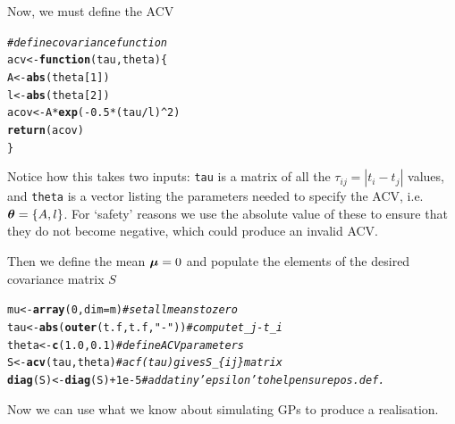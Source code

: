\documentclass[a4paper, 11pt, amsmath, graphicx]{article}\usepackage[]{graphicx}\usepackage[]{color}
\makeatletter
\newcommand{\hlnum}[1]{\textcolor[rgb]{0.686,0.059,0.569}{#1}}%
\newcommand{\hlstr}[1]{\textcolor[rgb]{0.192,0.494,0.8}{#1}}%
\newcommand{\hlcom}[1]{\textcolor[rgb]{0.678,0.584,0.686}{\textit{#1}}}%
\newcommand{\hlopt}[1]{\textcolor[rgb]{0,0,0}{#1}}%
\newcommand{\hlstd}[1]{\textcolor[rgb]{0.345,0.345,0.345}{#1}}%
\newcommand{\hlkwa}[1]{\textcolor[rgb]{0.161,0.373,0.58}{\textbf{#1}}}%
\newcommand{\hlkwb}[1]{\textcolor[rgb]{0.69,0.353,0.396}{#1}}%
\newcommand{\hlkwc}[1]{\textcolor[rgb]{0.333,0.667,0.333}{#1}}%
\newcommand{\hlkwd}[1]{\textcolor[rgb]{0.737,0.353,0.396}{\textbf{#1}}}%
\newenvironment{kframe}{%
 \def\at@end@of@kframe{}%
 \ifinner\ifhmode%
  \def\at@end@of@kframe{\end{minipage}}%
  \begin{minipage}{\columnwidth}%
 \fi\fi%
 \def\FrameCommand##1{\hskip\@totalleftmargin \hskip-\fboxsep
 \colorbox{shadecolor}{##1}\hskip-\fboxsep
     \hskip-\linewidth \hskip-\@totalleftmargin \hskip\columnwidth}%
 \MakeFramed {\advance\hsize-\width
   \@totalleftmargin\z@ \linewidth\hsize
   \@setminipage}}%
 {\par\unskip\endMakeFramed%
 \at@end@of@kframe}
\newenvironment{knitrout}{}{} %
\def\bmu{{\mbox{\boldmath $\mu$}}}
\def\bt{{\mbox{\boldmath $\theta$}}}
\makeatother
\begin{document}
Now, we must define the ACV 

\begin{knitrout}
\color{fgcolor}\begin{kframe}
\begin{alltt}
\hlcom{# define covariance function}
\hlstd{acv} \hlkwb{<-} \hlkwa{function}\hlstd{(}\hlkwc{tau}\hlstd{,} \hlkwc{theta}\hlstd{) \{}
  \hlstd{A} \hlkwb{<-} \hlkwd{abs}\hlstd{( theta[}\hlnum{1}\hlstd{] )}
  \hlstd{l} \hlkwb{<-} \hlkwd{abs}\hlstd{( theta[}\hlnum{2}\hlstd{] )}
  \hlstd{acov} \hlkwb{<-} \hlstd{A} \hlopt{*} \hlkwd{exp}\hlstd{(}\hlopt{-}\hlnum{0.5} \hlopt{*} \hlstd{(tau} \hlopt{/} \hlstd{l)}\hlopt{^}\hlnum{2}\hlstd{)}
  \hlkwd{return}\hlstd{(acov)}
\hlstd{\}}
\end{alltt}
\end{kframe}
\end{knitrout}

Notice how this takes two inputs: {\tt tau} is a matrix of all the $\tau_{ij} = |t_i - t_j|$ values, and {\tt theta} is a vector listing the parameters needed to specify the ACV, i.e. $\bt = \{ A, l \}$. For `safety' reasons we use the absolute value of these to ensure that they do not become negative, which could produce an invalid ACV.

Then we define the mean $\bmu = 0$ and  populate the elements of the desired covariance matrix $S$

\begin{knitrout}
\color{fgcolor}\begin{kframe}
\begin{alltt}
\hlstd{mu} \hlkwb{<-} \hlkwd{array}\hlstd{(}\hlnum{0}\hlstd{,} \hlkwc{dim} \hlstd{= m)}        \hlcom{# set all means to zero}
\hlstd{tau} \hlkwb{<-} \hlkwd{abs}\hlstd{(} \hlkwd{outer}\hlstd{(t.f, t.f,} \hlstr{"-"}\hlstd{) )} \hlcom{# compute t_j - t_i}
\hlstd{theta} \hlkwb{<-} \hlkwd{c}\hlstd{(}\hlnum{1.0}\hlstd{,} \hlnum{0.1}\hlstd{)}           \hlcom{# define ACV parameters}
\hlstd{S} \hlkwb{<-} \hlkwd{acv}\hlstd{(tau, theta)}           \hlcom{# acf(tau) gives S_\{ij\} matrix}
\hlkwd{diag}\hlstd{(S)} \hlkwb{<-} \hlkwd{diag}\hlstd{(S)} \hlopt{+} \hlnum{1e-5}      \hlcom{# add a tiny 'epsilon' to help ensure pos. def.}
\end{alltt}
\end{kframe}
\end{knitrout}

Now we can use what we know about simulating GPs to produce a realisation.
\end{document}
